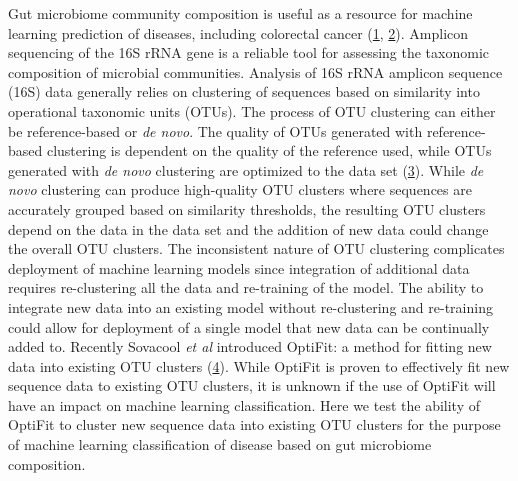 \documentclass[
]{article}
\begin{document}
\newpage

Gut microbiome community composition is useful as a resource for machine
learning prediction of diseases, including colorectal cancer
(\protect\hyperlink{ref-baxter2016}{1},
\protect\hyperlink{ref-zackular2014}{2}). Amplicon sequencing of the 16S
rRNA gene is a reliable tool for assessing the taxonomic composition of
microbial communities. Analysis of 16S rRNA amplicon sequence (16S) data
generally relies on clustering of sequences based on similarity into
operational taxonomic units (OTUs). The process of OTU clustering can
either be reference-based or \emph{de novo}. The quality of OTUs
generated with reference-based clustering is dependent on the quality of
the reference used, while OTUs generated with \emph{de novo} clustering
are optimized to the data set (\protect\hyperlink{ref-westcott2015}{3}).
While \emph{de novo} clustering can produce high-quality OTU clusters
where sequences are accurately grouped based on similarity thresholds,
the resulting OTU clusters depend on the data in the data set and the
addition of new data could change the overall OTU clusters. The
inconsistent nature of OTU clustering complicates deployment of machine
learning models since integration of additional data requires
re-clustering all the data and re-training of the model. The ability to
integrate new data into an existing model without re-clustering and
re-training could allow for deployment of a single model that new data
can be continually added to. Recently Sovacool \emph{et al} introduced
OptiFit: a method for fitting new data into existing OTU clusters
(\protect\hyperlink{ref-sovacool2022}{4}). While OptiFit is proven to
effectively fit new sequence data to existing OTU clusters, it is
unknown if the use of OptiFit will have an impact on machine learning
classification. Here we test the ability of OptiFit to cluster new
sequence data into existing OTU clusters for the purpose of machine
learning classification of disease based on gut microbiome composition.
\end{document}
